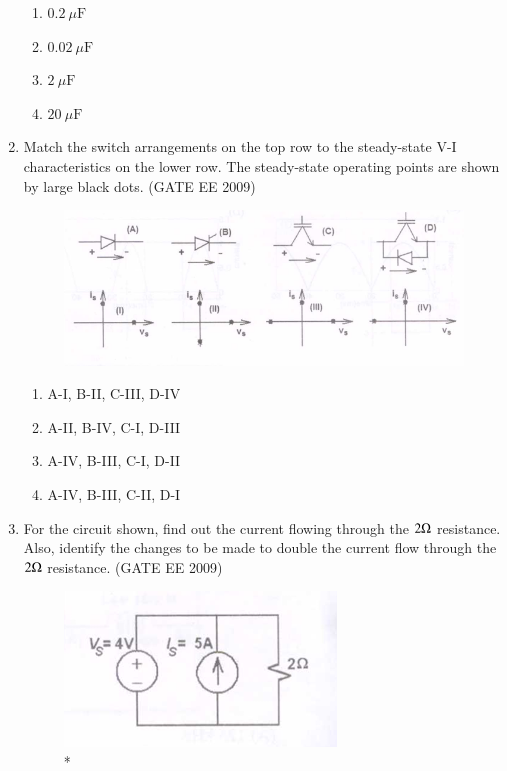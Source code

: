 \documentclass[journal,12pt,onecolumn]{IEEEtran}
\theoremstyle{remark}
\begin{document}
\begin{flushleft}
\begin{enumerate}
\begin{enumerate}
    \item  $0.2~\mu\mathrm{F}$
\item  $0.02~\mu\mathrm{F}$  
\item  $2~\mu\mathrm{F}$ 
\item  $20~\mu\mathrm{F}$ 
\end{enumerate}


\item Match the switch arrangements on the top row to the steady-state V-I characteristics on the lower row.
The steady-state operating points are shown by large black dots.
\hfill(GATE EE 2009)


\begin{figure}[h]
    \centering
    \includegraphics[width=0.5\columnwidth]{figs/Screenshot 2025-08-09 102009.png}
    \label{fig:placeholder}
\end{figure}




\begin{enumerate}
     \item  A-I, B-II, C-III, D-IV
    \item  A-II, B-IV, C-I, D-III
    \item  A-IV, B-III, C-I, D-II
    \item  A-IV, B-III, C-II, D-I
\end{enumerate}



\item For the circuit shown, find out the current flowing through the $2 \ohm$ resistance.
Also, identify the changes to be made to double the current flow through the $2\ohm$ resistance.
\hfill(GATE EE 2009)
\begin{figure}[h!]
    \centering
    \includegraphics[width=0.5\columnwidth]{figs/Screenshot 2025-08-09 102019.png}
    \caption{*}
    \label{fig:placeholder}
\end{figure}


\end{enumerate}
\end{flushleft}
\end{document}
